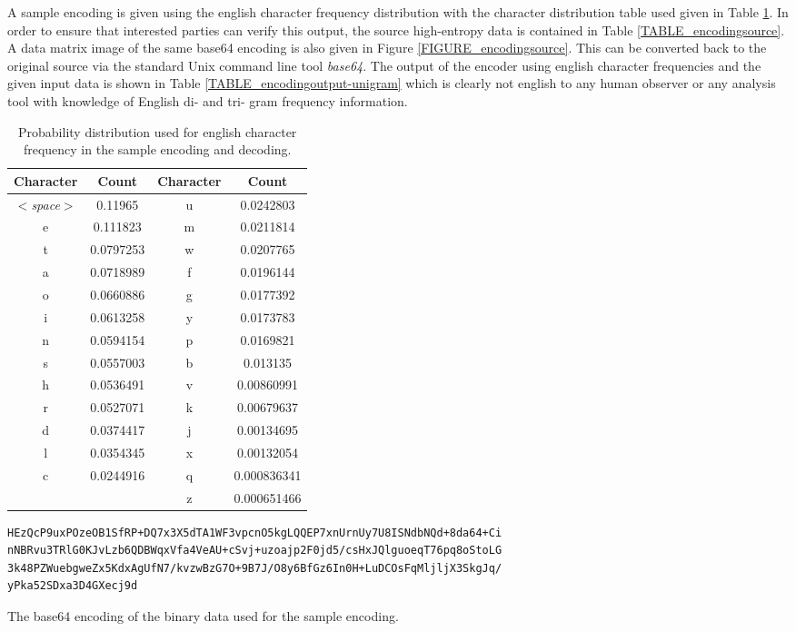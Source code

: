 \documentclass[12pt]{report}
\theoremstyle{remark}
\theoremstyle{definition}
\theoremstyle{definition}
\theoremstyle{definition}
\begin{document}
\begin{appendices}
A sample encoding is given using the english character
frequency distribution with the character distribution table used given in Table
\ref{TABLE_unigrams}. In order to ensure that interested parties can verify this
output, the source high-entropy data is contained in Table
\ref{TABLE_encodingsource}. A data matrix image of the same base64 encoding is
also given in Figure \ref{FIGURE_encodingsource}. This can be converted back to
the original source via the standard Unix command line tool \emph{base64}. The
output of the encoder using english character frequencies and the given input
data is shown in Table \ref{TABLE_encodingoutput-unigram} which is clearly not
english to any human observer or any analysis tool with knowledge of English di-
and tri- gram frequency information.

\begin{table}
\centering
\begin{tabular}{ | c | c || c | c | }
Character&Count&Character&Count\\
\hline
$<$\emph{space}$>$&0.11965  &  u&0.0242803\\
e&0.111823 &  m&0.0211814\\
t&0.0797253&  w&0.0207765\\
a&0.0718989&  f&0.0196144\\
o&0.0660886&  g&0.0177392\\
i&0.0613258&  y&0.0173783\\
n&0.0594154&  p&0.0169821\\
s&0.0557003&  b&0.013135\\
h&0.0536491&  v&0.00860991\\
r&0.0527071&  k&0.00679637\\
d&0.0374417&  j&0.00134695\\
l&0.0354345&  x&0.00132054\\
c&0.0244916&  q&0.000836341\\
       &    &  z&0.000651466\\
\end{tabular}
\caption[English character frequency]{Probability distribution used for english character frequency in the sample encoding and decoding.}
\label{TABLE_unigrams}
\end{table}

\begin{table}
\begin{verbatim}
HEzQcP9uxPOzeOB1SfRP+DQ7x3X5dTA1WF3vpcnO5kgLQQEP7xnUrnUy7U8ISNdbNQd+8da64+Ci
nNBRvu3TRlG0KJvLzb6QDBWqxVfa4VeAU+cSvj+uzoajp2F0jd5/csHxJQlguoeqT76pq8oStoLG
3k48PZWuebgweZx5KdxAgUfN7/kvzwBzG7O+9B7J/O8y6BfGz6In0H+LuDCOsFqMljljX3SkgJq/
yPka52SDxa3D4GXecj9d
\end{verbatim}
\caption[Encoding sample - source]{The base64 encoding of the binary data used for the sample encoding.}
\label{TABLE_encodingsource}
\end{table}


\end{appendices}
\end{document}
